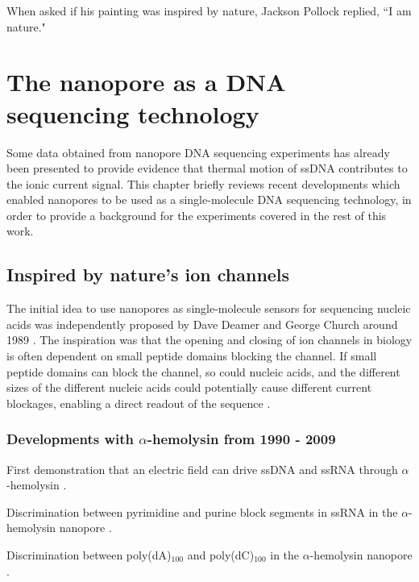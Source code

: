 \begin{savequote}[75mm]
When asked if his painting was inspired by nature, Jackson Pollock replied, ``I am nature."
\end{savequote}

\chapter{The nanopore as a DNA sequencing technology}
\label{dna_sequencing}

Some data obtained from nanopore DNA sequencing experiments has already been presented to provide evidence that thermal motion of ssDNA contributes to the ionic current signal.  This chapter briefly reviews recent developments which enabled nanopores to be used as a single-molecule DNA sequencing technology, in order to provide a background for the experiments covered in the rest of this work.

\section{Inspired by nature's ion channels}

The initial idea to use nanopores as single-molecule sensors for sequencing nucleic acids was independently proposed by Dave Deamer and George Church around 1989 \citep{Deamer2016,Branton2008}.  The inspiration was that the opening and closing of ion channels in biology is often dependent on small peptide domains blocking the channel.  If small peptide domains can block the channel, so could nucleic acids, and the different sizes of the different nucleic acids could potentially cause different current blockages, enabling a direct readout of the sequence \citep{Branton2008}.

\subsection{Developments with $\alpha$-hemolysin from 1990 - 2009}

First demonstration that an electric field can drive ssDNA and ssRNA through $\alpha$-hemolysin \citep{Kasianowicz1996}.

Discrimination between pyrimidine and purine block segments in ssRNA in the $\alpha$-hemolysin nanopore \citep{Akeson1999}.

Discrimination between poly(dA)$_{100}$ and poly(dC)$_{100}$ in the $\alpha$-hemolysin nanopore \citep{Meller2000, Meller2002}.

